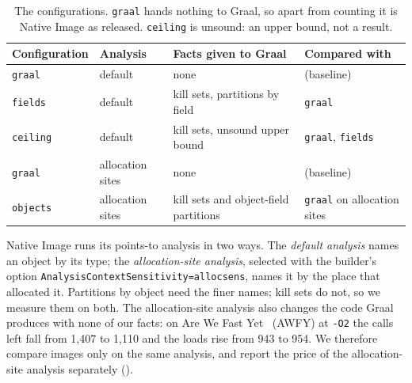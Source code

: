 \begin{table}[t]
    \centering
    \caption{The configurations. \texttt{graal} hands nothing to Graal, so apart from counting it is Native Image as
    released. \texttt{ceiling} is unsound: an upper bound, not a result.}
    \label{tab:eval-configurations}
    \footnotesize
    \begin{tabular}{llll}
        \toprule
        Configuration & Analysis & Facts given to Graal & Compared with \\
        \midrule
        \texttt{graal}     & default          & none                                   & (baseline) \\
        \texttt{fields}    & default          & kill sets, partitions by field         & \texttt{graal} \\
        \texttt{ceiling}   & default          & kill sets, unsound upper bound         & \texttt{graal}, \texttt{fields} \\
        \texttt{graal}     & allocation sites & none                                   & (baseline) \\
        \texttt{objects}   & allocation sites & kill sets and object-field partitions  & \texttt{graal} on allocation sites \\
        \bottomrule
    \end{tabular}
\end{table}

Native Image runs its points-to analysis in two ways. The \emph{default analysis} names an object by its type; the
\emph{allocation-site analysis}, selected with the builder's option \texttt{AnalysisContextSensitivity=allocsens}, names it by the
place that allocated it. Partitions by object need the finer names; kill sets do not, so we measure them on both. The
allocation-site analysis also changes the code Graal produces with none of our facts: on Are We Fast Yet~\cite{marr2016awfy}
(AWFY) at \texttt{-O2} the calls left fall from 1,407 to 1,110 and the loads rise from 943 to 954. We therefore compare images
only on the same analysis, and report the price of the allocation-site analysis separately ().

